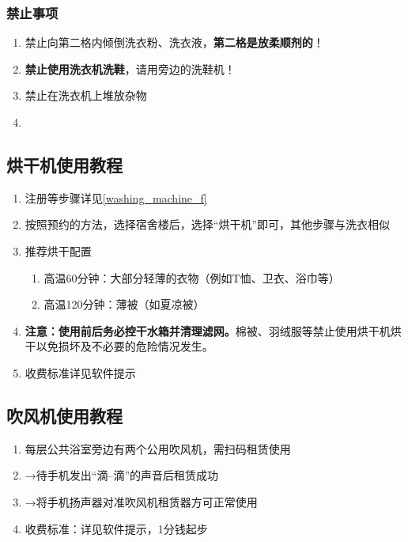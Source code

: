 \subsubsection[禁止事项]{禁止事项}
\begin{enumerate}
    \item 禁止向第二格内倾倒洗衣粉、洗衣液，\textbf{第二格是放柔顺剂的}！
    \item \textbf{禁止使用洗衣机洗鞋}，请用旁边的洗鞋机！
    \item 禁止在洗衣机上堆放杂物
    \item \textbf{}
\end{enumerate}

\subsection[烘干机使用教程]{烘干机使用教程}
\label{dry_machine}
\begin{enumerate}
    \item 注册等步骤详见\uline{\ref{washing_machine_f}}
    \item 按照预约的方法，选择宿舍楼后，选择“烘干机”即可，其他步骤与洗衣相似
    \item 推荐烘干配置
          \begin{enumerate}
              \item 高温60分钟：大部分轻薄的衣物（例如T恤、卫衣、浴巾等）
              \item 高温120分钟：薄被（如夏凉被）
          \end{enumerate}
    \item \textbf{注意：}\textbf{使用前后务必控干水箱并清理滤网。}棉被、羽绒服等禁止使用烘干机烘干以免损坏及不必要的危险情况发生。
    \item 收费标准详见软件提示
\end{enumerate}

\subsection[吹风机使用教程]{吹风机使用教程}
\label{hair_drier}
\begin{enumerate}
    \item 每层公共浴室旁边有两个公用吹风机，需扫码\footnotemark 租赁使用
    \item →待手机发出“滴--滴”的声音后租赁成功
    \item →将手机扬声器对准吹风机租赁器方可正常使用
    \item 收费标准：详见软件提示，1分钱起步
\end{enumerate}

